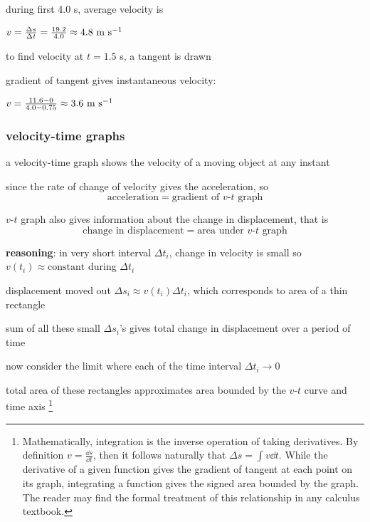 \sol during first 4.0 s, average velocity is

{
	\centering
	
	$ v = \frac{\Delta s}{\Delta t} = \frac{19.2}{4.0} \approx 4.8 \text{ m s$^{-1}$}$
	
}

to find velocity at $t=1.5$ s, a tangent is drawn

gradient of tangent gives instantaneous velocity:

{
	\centering
	
	$ v = \frac{11.6 - 0}{4.0-0.75} \approx 3.6 \text{ m s$^{-1}$} $
	
}

\vspace*{-\baselineskip} \eoe

\subsubsection{velocity-time graphs}

a velocity-time graph shows the velocity of a moving object at any instant

\cmt since the rate of change of velocity gives the acceleration, so
\begin{equation*}
\boxed{\text{acceleration} = \text{gradient of $v$-$t$ graph}}
\end{equation*}

\cmt $v$-$t$ graph also gives information about the change in displacement, that is
\begin{equation*}
\boxed{\text{change in displacement} = \text{area under $v$-$t$ graph}}
\end{equation*}

\noindent\textbf{reasoning}: in very short interval $\Delta t_i$, change in velocity is small so $v(t_i)\approx\text{constant}$ during $\Delta t_i$

displacement moved out $\Delta s_i \approx v(t_i) \Delta t_i$, which corresponds to area of a thin rectangle

sum of all these small $\Delta s_i$'s gives total change in displacement over a period of time

now consider the limit where each of the time interval $\Delta t_i \to 0$

total area of these rectangles approximates area bounded by the $v$-$t$ curve and time axis
\footnote{Mathematically, integration is the inverse operation of taking derivatives. By definition $v=\frac{\dd s}{\dd t}$, then it follows naturally that $\Delta s = \int v\dd t$. While the derivative of a given function gives the gradient of tangent at each point on its graph, integrating a function gives the signed area bounded by the graph. The reader may find the formal treatment of this relationship in any calculus textbook.}



